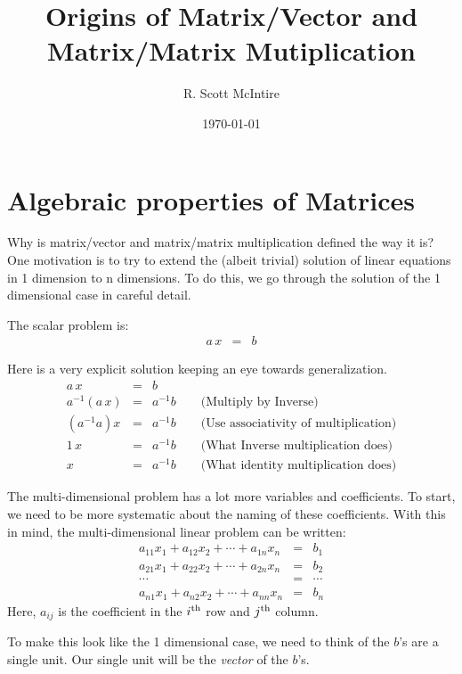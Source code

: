 \documentclass{article}
\title{Origins of Matrix/Vector and Matrix/Matrix Mutiplication}
\author{R. Scott McIntire}
\date{\today}
\begin{document}
\maketitle


\section{Algebraic properties of Matrices}
Why is matrix/vector and matrix/matrix multiplication defined the way it is?
One motivation is to try to extend the (albeit trivial) solution of linear
equations in 1 dimension to n dimensions. To do this, we go through the solution
of the 1 dimensional case in careful detail.

The scalar problem is:
\begin{eqnarray}
  a \, x & = & b \label{scalar-problem}
\end{eqnarray}

Here is a very explicit solution keeping an eye towards generalization.
\begin{eqnarray}
  a \, x & = & b \\
  a^{-1} ( a \, x ) & = & a^{-1} b \quad \quad \text{(Multiply by Inverse)} \label{inv} \\
  (a^{-1} a) x & = & a^{-1} b \quad \quad \text{(Use associativity of multiplication)} \label{assoc} \\
  1 \, x & = & a^{-1} b \quad \quad \text{(What Inverse multiplication does)} \label{inv-mult} \\
  x & = & a^{-1} b \quad \quad \text{(What identity multiplication does)} \label{identity}
\end{eqnarray}

The multi-dimensional problem has a lot more variables and coefficients.
To start, we need to be more systematic about the naming of these coefficients.
With this in mind, the multi-dimensional linear problem can be written:
\begin{eqnarray*}
  a_{11} x_1 + a_{12} x_2 + \cdots + a_{1n} x_n & = & b_1 \\
  a_{21} x_1 + a_{22} x_2 + \cdots + a_{2n} x_n & = & b_2 \\
  \cdots & = & \cdots \\
  a_{n1} x_1 + a_{n2} x_2 + \cdots + a_{nn} x_n & = & b_n 
\end{eqnarray*}
Here, $a_{ij}$ is the coefficient in the $i^{\rm th}$ row and $j^{\rm th}$ column.

To make this look like the 1 dimensional case, we need to think of the $b$'s are
a single unit. Our single unit will be the {\em vector\/} of the $b$'s.
\end{document}
